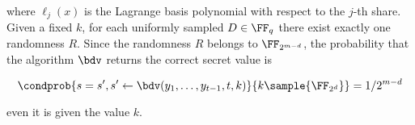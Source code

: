 \documentclass[envcountsame,runningheads,notitlepage]{llncs}
\begin{document}
	where $\ell_{j}(x)$ is the  Lagrange basis polynomial with respect to the $j$-th share.
	Given a fixed $k$, for each uniformly sampled $D \in \FF_q$ there exist exactly one randomness $R$.  
	Since the randomness $R$ belongs to $\FF_{2^{m - d}}$, the probability that the algorithm $\bdv$ returns the correct secret value is 
	
	\begin{equation*}
		\condprob{s = s', s' \leftarrow \bdv(y_1, \ldots, y_{t-1}, t, k)}{k \sample {\FF_{2^d}}} = 1/2^{m - d}
	\end{equation*}
	
	even it is given the value $k$.
	
	
	
	
	
\end{document}
